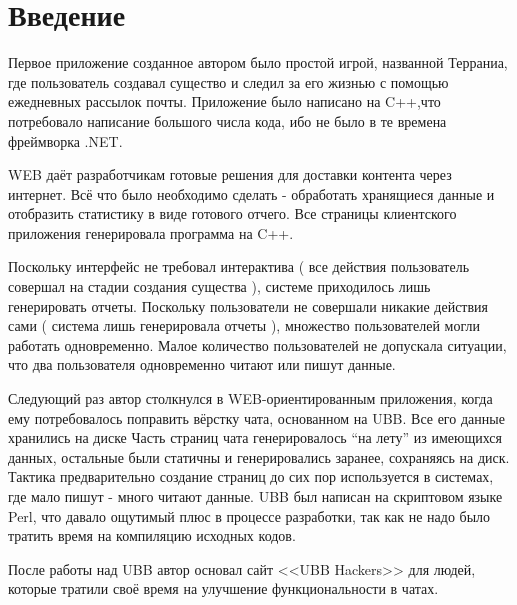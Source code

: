\chapter*{Введение}							%




Первое приложение созданное автором было простой игрой, названной Терраниа, где пользователь создавал существо и следил за его жизнью с помощью ежедневных рассылок почты. Приложение было написано на C++,что потребовало написание большого числа кода, ибо не было в те времена фреймворка .NET.

WEB  даёт разработчикам готовые решения для доставки контента через интернет. Всё что было необходимо сделать - обработать хранящиеся данные и отобразить статистику в виде готового отчего. Все страницы клиентского приложения генерировала программа на C++.

Поскольку интерфейс не требовал интерактива ( все действия пользователь совершал на стадии создания существа ),  системе приходилось лишь генерировать отчеты. Поскольку пользователи не совершали никакие действия сами ( система лишь генерировала отчеты ), множество пользователей могли работать одновременно. Малое количество пользователей не допускала ситуации, что два пользователя одновременно читают или пишут данные.


Следующий раз автор столкнулся в WEB-ориентированным приложения, когда ему потребовалось поправить вёрстку чата, основанном на  UBB. Все его данные хранились на диске Часть страниц чата генерировалось ``на лету'' из имеющихся данных, остальные были статичны и генерировались заранее, сохраняясь на диск. Тактика предварительно создание страниц до сих пор используется в системах, где мало пишут - много читают данные. UBB был написан на скриптовом языке Perl, что давало ощутимый плюс в процессе разработки, так как не надо было тратить время на компиляцию исходных кодов.

После работы над UBB автор основал сайт <<UBB Hackers>> для людей, которые тратили своё время на улучшение функциональности в чатах. 

